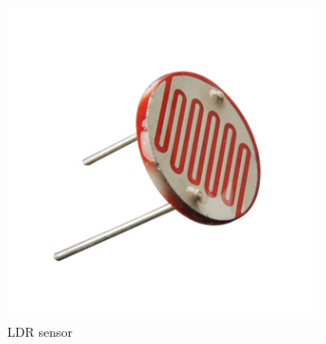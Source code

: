 \documentclass[12pt, a4paper,twoside]{tesi_upf}
\begin{document}
      \begin{figure}
        \centering
        \begin{subfigure}[b]{0.3\textwidth}
                \includegraphics[width=\textwidth]{./Figures/LDR.jpg}
                \caption{LDR sensor}
                \label{fig:LDR}
        \end{subfigure}%
        ~ %
        \begin{subfigure}[b]{0.3\textwidth}

\end{subfigure}
\end{figure}
\end{document}
